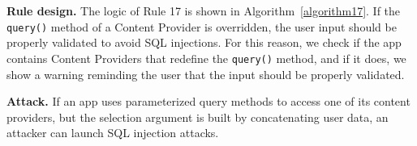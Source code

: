 \textbf{Rule design.} The logic of Rule 17 is shown in Algorithm~\ref{algorithm17}. If the \texttt{query()} method of a Content Provider is overridden, the user input should be properly validated to avoid SQL injections. For this reason, we check if the app contains Content Providers that redefine the \texttt{query()} method, and if it does, we show a warning reminding the user that the input should be properly validated. 

\setcounter{algocf}{16}
\begin{algorithm}[]
\SetAlgoLined
{}
\caption{}
\label{algorithm17}
\end{algorithm}

\textbf{Attack.} If an app uses parameterized query methods to access one of its content providers, but the selection argument is built by concatenating user data, an attacker can launch SQL injection attacks. 


